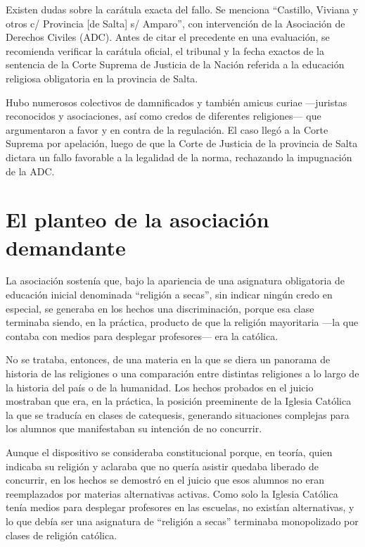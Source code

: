 \documentclass[12pt,oneside]{book}
\begin{document}
\begin{important}
Existen dudas sobre la carátula exacta del fallo. Se menciona ``Castillo, Viviana y otros c/ Provincia [de Salta] s/ Amparo'', con intervención de la Asociación de Derechos Civiles (ADC). Antes de citar el precedente en una evaluación, se recomienda verificar la carátula oficial, el tribunal y la fecha exactos de la sentencia de la Corte Suprema de Justicia de la Nación referida a la educación religiosa obligatoria en la provincia de Salta.
\end{important}

Hubo numerosos colectivos de damnificados y también amicus curiae —juristas reconocidos y asociaciones, así como credos de diferentes religiones— que argumentaron a favor y en contra de la regulación. El caso llegó a la Corte Suprema por apelación, luego de que la Corte de Justicia de la provincia de Salta dictara un fallo favorable a la legalidad de la norma, rechazando la impugnación de la ADC.

\section{El planteo de la asociación demandante}

La asociación sostenía que, bajo la apariencia de una asignatura obligatoria de educación inicial denominada ``religión a secas'', sin indicar ningún credo en especial, se generaba en los hechos una discriminación, porque esa clase terminaba siendo, en la práctica, producto de que la religión mayoritaria —la que contaba con medios para desplegar profesores— era la católica.

No se trataba, entonces, de una materia en la que se diera un panorama de historia de las religiones o una comparación entre distintas religiones a lo largo de la historia del país o de la humanidad. Los hechos probados en el juicio mostraban que era, en la práctica, la posición preeminente de la Iglesia Católica la que se traducía en clases de catequesis, generando situaciones complejas para los alumnos que manifestaban su intención de no concurrir.

Aunque el dispositivo se consideraba constitucional porque, en teoría, quien indicaba su religión y aclaraba que no quería asistir quedaba liberado de concurrir, en los hechos se demostró en el juicio que esos alumnos no eran reemplazados por materias alternativas activas. Como solo la Iglesia Católica tenía medios para desplegar profesores en las escuelas, no existían alternativas, y lo que debía ser una asignatura de ``religión a secas'' terminaba monopolizado por clases de religión católica.
\end{document}
